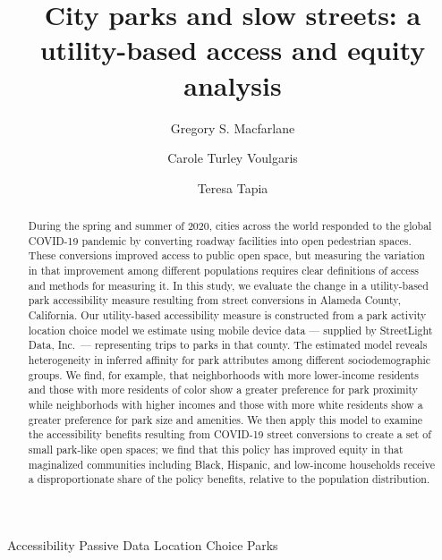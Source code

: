 \documentclass[3p, authoryear, review]{elsarticle} %
\begin{document}
\begin{frontmatter}

  \title{City parks and slow streets: a utility-based access and equity analysis}
    \author[BYU]{Gregory S. Macfarlane}
    \author[Harvard]{Carole Turley Voulgaris}
    \author[StreetLight]{Teresa Tapia}
      \address[BYU]{Brigham Young University, Civil and Environmental Engineering Department, 430 Engineering Building, Provo, Utah 84602}
    \address[Harvard]{Harvard Graduate School of Design, 48 Quincy St, Cambridge, Massachussetts 02138}
    \address[StreetLight]{StreetLight Data, Inc., San Francisco, California}
  
  \begin{abstract}
  During the spring and summer of 2020, cities across the world responded to the global COVID-19 pandemic by converting roadway facilities into open pedestrian spaces. These conversions improved access to public open space, but measuring the variation in that improvement among different populations requires clear definitions of access and methods for measuring it. In this study, we evaluate the change in a utility-based park accessibility measure resulting from street conversions in Alameda County, California. Our utility-based accessibility measure is constructed from a park activity location choice model we estimate using mobile device data --- supplied by StreetLight Data, Inc.~--- representing trips to parks in that county. The estimated model reveals heterogeneity in inferred affinity for park attributes among different sociodemographic groups. We find, for example, that neighborhoods with more lower-income residents and those with more residents of color show a greater preference for park proximity while neighborhods with higher incomes and those with more white residents show a greater preference for park size and amenities. We then apply this model to examine the accessibility benefits resulting from COVID-19 street conversions to create a set of small park-like open spaces; we find that this policy has improved equity in that maginalized communities including Black, Hispanic, and low-income households receive a disproportionate share of the policy benefits, relative to the population distribution.
  \end{abstract}
   \begin{keyword} Accessibility Passive Data Location Choice Parks\end{keyword}
 \end{frontmatter}
\end{document}
